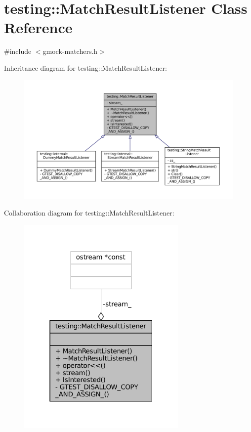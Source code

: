 \hypertarget{classtesting_1_1MatchResultListener}{}\section{testing\+:\+:Match\+Result\+Listener Class Reference}
\label{classtesting_1_1MatchResultListener}


{\ttfamily \#include $<$gmock-\/matchers.\+h$>$}



Inheritance diagram for testing\+:\+:Match\+Result\+Listener\+:
\nopagebreak
\begin{figure}[H]
\begin{center}
\leavevmode
\includegraphics[width=350pt]{classtesting_1_1MatchResultListener__inherit__graph}
\end{center}
\end{figure}


Collaboration diagram for testing\+:\+:Match\+Result\+Listener\+:
\nopagebreak
\begin{figure}[H]
\begin{center}
\leavevmode
\includegraphics[width=235pt]{classtesting_1_1MatchResultListener__coll__graph}
\end{center}
\end{figure}
